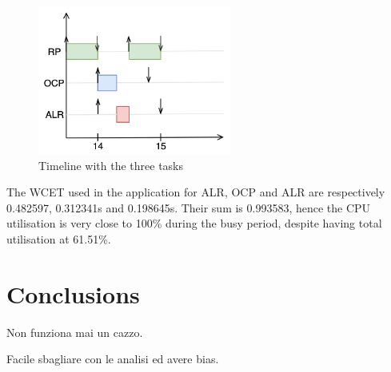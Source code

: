 \documentclass{article}
\begin{document}
\begin{figure}[!htbp]
\centering
\includegraphics[width=2.5in]{images/critical-instant}
\caption{Timeline with the three tasks}
\label{critical-instant}
\end{figure}

The WCET used in the application for ALR, OCP and ALR are respectively 0.482597, 0.312341s and 0.198645s. Their sum is 0.993583, hence the CPU utilisation is very close to 100\% during the busy period, despite having total utilisation at 61.51\%.

\section{Conclusions}

Non funziona mai un cazzo.

Facile sbagliare con le analisi ed avere bias.


\end{document}
